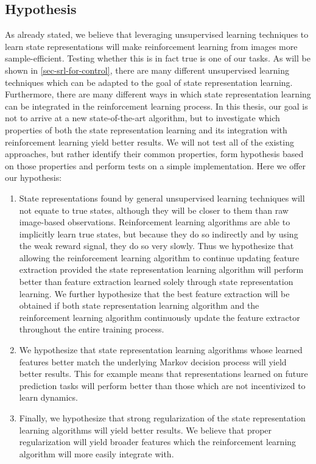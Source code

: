 \subsection{Hypothesis}
\label{subsec-hypothesis}
As already stated, we believe that leveraging unsupervised learning techniques
to learn state representations will make reinforcement learning from images
more sample-efficient.
Testing whether this is in fact true is one of our tasks.
As will be shown in \ref{sec-srl-for-control}, there are many different unsupervised learning
techniques which can be adapted to the goal of state representation learning.
Furthermore, there are many different ways in which state representation learning can be integrated
in the reinforcement learning process.
In this thesis, our goal is not to arrive at a new state-of-the-art algorithm,
but to investigate which properties of both the state representation learning and its integration
with reinforcement learning yield better results.
We will not test all of the existing approaches, but rather identify their common properties,
form hypothesis based on those properties and perform tests on a simple implementation.
Here we offer our hypothesis:
\begin{enumerate}
		\item State representations found by general unsupervised learning techniques 
		will not equate to true states, although they will be closer to them than
		raw image-based observations. Reinforcement learning algorithms are able
		to implicitly learn true states, but because they do so indirectly and by using
		the weak reward signal, they do so very slowly.
		Thus we hypothesize that allowing the reinforcement learning algorithm to continue updating
		feature extraction provided the state representation learning algorithm will perform better
		than feature extraction learned solely through state representation learning.
		We further hypothesize that the best feature extraction will be obtained if both
		state representation learning algorithm and the reinforcement learning algorithm 
		continuously update the feature extractor throughout the entire training process.
		\label{parallel-training-hypothesis}
\item We hypothesize that state representation learning algorithms whose learned features better match the underlying
		Markov decision process will yield better results.
		This for example means that representations learned on future prediction tasks will
		perform better than those which are not incentivized to learn dynamics.
		\label{good-features-hypothesis}
\item Finally, we hypothesize that strong regularization of the state representation learning
		algorithms will yield better results. We believe that proper regularization will
		yield broader features which the reinforcement learning algorithm will 
		more easily integrate with.
		\label{regularization-hypothesis}
\end{enumerate}




